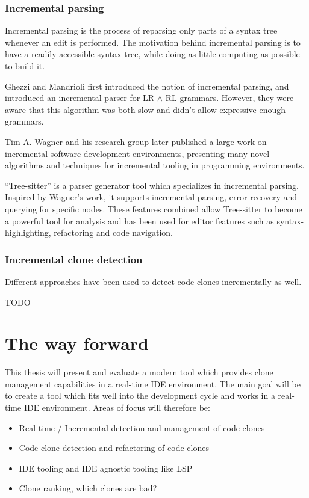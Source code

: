 \documentclass[12pt]{article}
\begin{document}
\subsubsection{Incremental parsing}

Incremental parsing is the process of reparsing only parts of a syntax tree whenever an
edit is performed. The motivation behind incremental parsing is to have a readily
accessible syntax tree, while doing as little computing as possible to build it.

Ghezzi and Mandrioli first introduced the notion of incremental parsing, and introduced an
incremental parser for LR $\land$ RL grammars. However, they were aware that this
algorithm was both slow and didn't allow expressive enough
grammars.\cite{incrementalparsing}

Tim A. Wagner and his research group later published a large work on incremental software
development environments, presenting many novel algorithms and techniques for incremental
tooling in programming environments.\cite{PracticleAlgorithmsForIncremental}

``Tree-sitter'' is a parser generator tool which specializes in incremental parsing.
Inspired by Wagner's work, it supports incremental parsing, error recovery and querying
for specific nodes.\cite{treesitter} These features combined allow Tree-sitter to become a
powerful tool for analysis and has been used for editor features such as
syntax-highlighting, refactoring and code navigation.

\subsubsection{Incremental clone detection}

Different approaches have been used to detect code clones incrementally as well.

TODO

\section{The way forward}

This thesis will present and evaluate a modern tool which provides clone management
capabilities in a real-time IDE environment. The main goal will be to create a tool which
fits well into the development cycle and works in a real-time IDE environment. Areas of
focus will therefore be:

\begin{itemize}
	\item Real-time / Incremental detection and management of code clones
	\item Code clone detection and refactoring of code clones
	\item IDE tooling and IDE agnostic tooling like LSP
	\item Clone ranking, which clones are bad?
\end{itemize}
\end{document}

